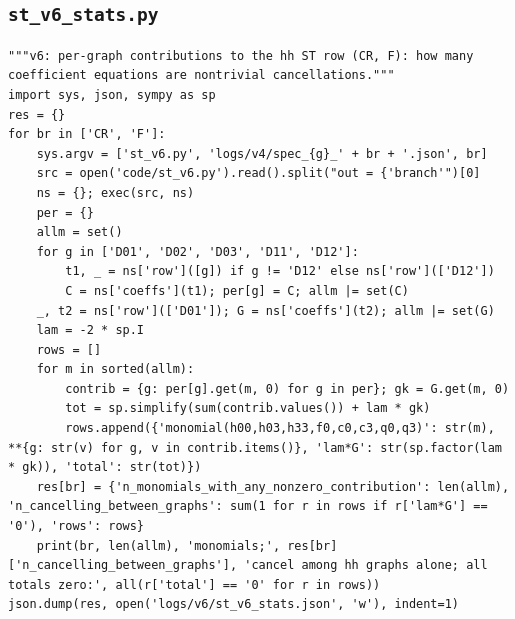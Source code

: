 \documentclass[10pt]{article}
\begin{document}
\subsection{\texttt{st\_v6\_stats.py}}
\begin{lstlisting}
"""v6: per-graph contributions to the hh ST row (CR, F): how many coefficient equations are nontrivial cancellations."""
import sys, json, sympy as sp
res = {}
for br in ['CR', 'F']:
    sys.argv = ['st_v6.py', 'logs/v4/spec_{g}_' + br + '.json', br]
    src = open('code/st_v6.py').read().split("out = {'branch'")[0]
    ns = {}; exec(src, ns)
    per = {}
    allm = set()
    for g in ['D01', 'D02', 'D03', 'D11', 'D12']:
        t1, _ = ns['row']([g]) if g != 'D12' else ns['row'](['D12'])
        C = ns['coeffs'](t1); per[g] = C; allm |= set(C)
    _, t2 = ns['row'](['D01']); G = ns['coeffs'](t2); allm |= set(G)
    lam = -2 * sp.I
    rows = []
    for m in sorted(allm):
        contrib = {g: per[g].get(m, 0) for g in per}; gk = G.get(m, 0)
        tot = sp.simplify(sum(contrib.values()) + lam * gk)
        rows.append({'monomial(h00,h03,h33,f0,c0,c3,q0,q3)': str(m), **{g: str(v) for g, v in contrib.items()}, 'lam*G': str(sp.factor(lam * gk)), 'total': str(tot)})
    res[br] = {'n_monomials_with_any_nonzero_contribution': len(allm), 'n_cancelling_between_graphs': sum(1 for r in rows if r['lam*G'] == '0'), 'rows': rows}
    print(br, len(allm), 'monomials;', res[br]['n_cancelling_between_graphs'], 'cancel among hh graphs alone; all totals zero:', all(r['total'] == '0' for r in rows))
json.dump(res, open('logs/v6/st_v6_stats.json', 'w'), indent=1)
\end{lstlisting}
\end{document}
